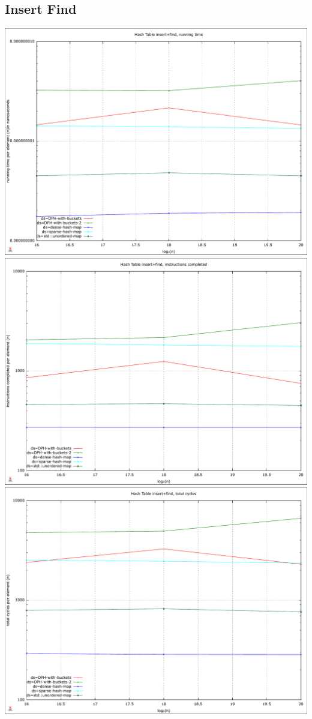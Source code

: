 \documentclass{article}
\begin{document}
\subsection*{Insert Find}
\centering
\includegraphics[width=\linewidth]{img/hash_insert-find_time}
\includegraphics[width=\linewidth]{img/hash_insert-find_instructions}
\includegraphics[width=\linewidth]{img/hash_insert-find_cycles}
\end{document}
